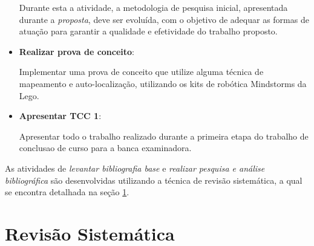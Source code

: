 \begin{itemize}
		Durante esta a atividade, a metodologia de pesquisa inicial, apresentada durante a \textit{proposta}, deve ser evoluída, com o objetivo de adequar as formas de atuação para garantir a qualidade e efetividade do trabalho proposto. 

	\item \textbf{Realizar prova de conceito}:

		Implementar uma prova de conceito que utilize alguma técnica de mapeamento e auto-localização, utilizando os kits de robótica Mindstorms da Lego.

	\item \textbf{Apresentar TCC 1}:

		Apresentar todo o trabalho realizado durante a primeira etapa do trabalho de conclusao de curso para a banca examinadora.
\end{itemize}

As atividades de \textit{levantar bibliografia base} e \textit{realizar pesquisa e análise bibliográfica} são desenvolvidas utilizando a técnica de revisão sistemática, a qual se encontra detalhada na seção \ref{sec:revisão_sistemática}.

\section{Revisão Sistemática} %
\label{sec:revisão_sistemática}

